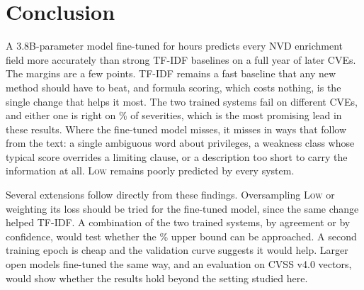 \section{Conclusion}
A 3.8B-parameter model fine-tuned for \nLoraTrainHours{} hours predicts every NVD enrichment field more accurately than strong TF-IDF baselines on a full year of later CVEs.
The margins are a few points.
TF-IDF remains a fast baseline that any new method should have to beat, and formula scoring, which costs nothing, is the single change that helps it most.
The two trained systems fail on different CVEs, and either one is right on \nEitherSev\% of severities, which is the most promising lead in these results.
Where the fine-tuned model misses, it misses in ways that follow from the text: a single ambiguous word about privileges, a weakness class whose typical score overrides a limiting clause, or a description too short to carry the information at all.
\textsc{Low} remains poorly predicted by every system.

Several extensions follow directly from these findings.
Oversampling \textsc{Low} or weighting its loss should be tried for the fine-tuned model, since the same change helped TF-IDF.
A combination of the two trained systems, by agreement or by confidence, would test whether the \nEitherSev\% upper bound can be approached.
A second training epoch is cheap and the validation curve suggests it would help.
Larger open models fine-tuned the same way, and an evaluation on CVSS v4.0 vectors, would show whether the results hold beyond the setting studied here.
